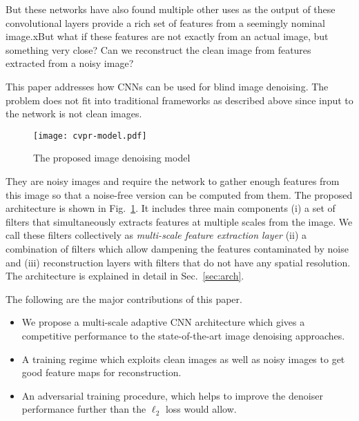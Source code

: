 \documentclass[10pt,twocolumn,letterpaper]{proc}
\begin{document}
But these networks have also found multiple other uses as the output of these convolutional layers provide a rich set of features from a seemingly nominal image.xBut what if these features are not exactly from an actual image, but something very close?
Can we reconstruct the clean image from features extracted from a noisy image?


This paper addresses how CNNs can be used for blind image denoising.
The problem does not fit into traditional frameworks as described above since input to the network is not clean images.

\begin{figure}[thbp]
\begin{center}
	\texttt{[image: cvpr-model.pdf]}
\caption{The proposed image denoising model}
\label{fig:arch}
\end{center}
\end{figure}
They are noisy images and require the network to gather enough features from this image so that a noise-free version can be computed from them.
The proposed architecture is shown in Fig.~\ref{fig:arch}. It includes three main components 
(i) a set of filters that simultaneously extracts features at multiple scales from the image. We call these filters collectively as \textit{multi-scale feature extraction layer} 
(ii) a combination of filters which allow dampening the features contaminated by noise and 
(iii) reconstruction layers with filters that do not have any spatial resolution. The architecture is explained in detail in Sec.~\ref{sec:arch}.

	
The following are the major contributions of this paper.
\begin{itemize}
    \item We propose a multi-scale adaptive CNN architecture which gives a competitive performance to the state-of-the-art image denoising approaches.
    \item A training regime which exploits clean images as well as noisy images to get good feature maps for reconstruction.
    \item An adversarial training procedure, which helps to improve the denoiser performance further than the $\ell_2$ loss would allow. 
\end{itemize}
\end{document}
